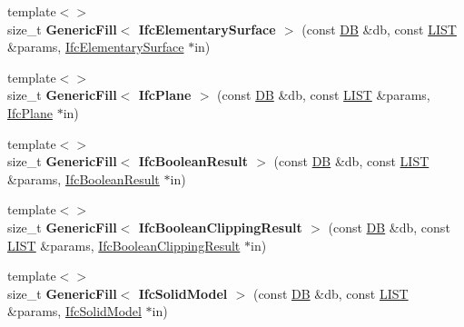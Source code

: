 \begin{DoxyCompactItemize}
\item 
\hypertarget{namespace_assimp_1_1_s_t_e_p_aaa2f892cbc2f7606f17071cc403160cd}{{\footnotesize template$<$$>$ }\\size\+\_\+t {\bfseries Generic\+Fill$<$ Ifc\+Elementary\+Surface $>$} (const \hyperlink{class_assimp_1_1_s_t_e_p_1_1_d_b}{D\+B} \&db, const \hyperlink{class_assimp_1_1_s_t_e_p_1_1_e_x_p_r_e_s_s_1_1_l_i_s_t}{L\+I\+S\+T} \&params, \hyperlink{struct_assimp_1_1_i_f_c_1_1_ifc_elementary_surface}{Ifc\+Elementary\+Surface} $\ast$in)}\label{namespace_assimp_1_1_s_t_e_p_aaa2f892cbc2f7606f17071cc403160cd}

\item 
\hypertarget{namespace_assimp_1_1_s_t_e_p_a2bd9377964c4731082c515efcac4324d}{{\footnotesize template$<$$>$ }\\size\+\_\+t {\bfseries Generic\+Fill$<$ Ifc\+Plane $>$} (const \hyperlink{class_assimp_1_1_s_t_e_p_1_1_d_b}{D\+B} \&db, const \hyperlink{class_assimp_1_1_s_t_e_p_1_1_e_x_p_r_e_s_s_1_1_l_i_s_t}{L\+I\+S\+T} \&params, \hyperlink{struct_assimp_1_1_i_f_c_1_1_ifc_plane}{Ifc\+Plane} $\ast$in)}\label{namespace_assimp_1_1_s_t_e_p_a2bd9377964c4731082c515efcac4324d}

\item 
\hypertarget{namespace_assimp_1_1_s_t_e_p_aec42f8d48b3276db600c1f69e89e97d1}{{\footnotesize template$<$$>$ }\\size\+\_\+t {\bfseries Generic\+Fill$<$ Ifc\+Boolean\+Result $>$} (const \hyperlink{class_assimp_1_1_s_t_e_p_1_1_d_b}{D\+B} \&db, const \hyperlink{class_assimp_1_1_s_t_e_p_1_1_e_x_p_r_e_s_s_1_1_l_i_s_t}{L\+I\+S\+T} \&params, \hyperlink{struct_assimp_1_1_i_f_c_1_1_ifc_boolean_result}{Ifc\+Boolean\+Result} $\ast$in)}\label{namespace_assimp_1_1_s_t_e_p_aec42f8d48b3276db600c1f69e89e97d1}

\item 
\hypertarget{namespace_assimp_1_1_s_t_e_p_a95049576cbfe187f8b423911bf8c811e}{{\footnotesize template$<$$>$ }\\size\+\_\+t {\bfseries Generic\+Fill$<$ Ifc\+Boolean\+Clipping\+Result $>$} (const \hyperlink{class_assimp_1_1_s_t_e_p_1_1_d_b}{D\+B} \&db, const \hyperlink{class_assimp_1_1_s_t_e_p_1_1_e_x_p_r_e_s_s_1_1_l_i_s_t}{L\+I\+S\+T} \&params, \hyperlink{struct_assimp_1_1_i_f_c_1_1_ifc_boolean_clipping_result}{Ifc\+Boolean\+Clipping\+Result} $\ast$in)}\label{namespace_assimp_1_1_s_t_e_p_a95049576cbfe187f8b423911bf8c811e}

\item 
\hypertarget{namespace_assimp_1_1_s_t_e_p_a4b40c6fbd908dd8162c1ff7c56da8cf8}{{\footnotesize template$<$$>$ }\\size\+\_\+t {\bfseries Generic\+Fill$<$ Ifc\+Solid\+Model $>$} (const \hyperlink{class_assimp_1_1_s_t_e_p_1_1_d_b}{D\+B} \&db, const \hyperlink{class_assimp_1_1_s_t_e_p_1_1_e_x_p_r_e_s_s_1_1_l_i_s_t}{L\+I\+S\+T} \&params, \hyperlink{struct_assimp_1_1_i_f_c_1_1_ifc_solid_model}{Ifc\+Solid\+Model} $\ast$in)}\label{namespace_assimp_1_1_s_t_e_p_a4b40c6fbd908dd8162c1ff7c56da8cf8}


\end{DoxyCompactItemize}

